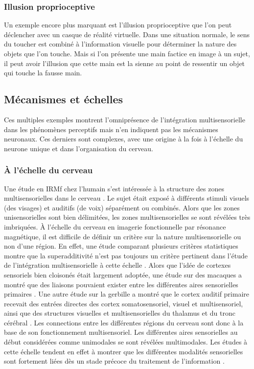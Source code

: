 \subsubsection{Illusion proprioceptive}

Un exemple encore plus marquant est l'illusion proprioceptive que l'on peut déclencher avec un casque de réalité virtuelle. Dans une situation normale, le sens du toucher est combiné à l'information visuelle pour déterminer la nature des objets que l'on touche. Mais si l'on présente une main factice en image à un sujet, il peut avoir l'illusion que cette main est la sienne au point de ressentir un objet qui touche la fausse main.

\subsection{Mécanismes et échelles}

Ces multiples exemples montrent l'omniprésence de l'intégration multisensorielle dans les phénomènes perceptifs mais n'en indiquent pas les mécanismes neuronaux. Ces derniers sont complexes, avec une origine à la fois à l'échelle du neurone unique et dans l'organisation du cerveau.

\subsubsection{À l'échelle du cerveau}

Une étude en IRMf chez l'humain s'est intéressée à la structure des zones multisensorielles dans le cerveau \cite{beauchamp_unraveling_2004}. Le sujet était exposé à différents stimuli visuels (des visages) et auditifs (de voix) séparément ou combinés. Alors que les zones unisensorielles sont bien délimitées, les zones multisensorielles se sont révélées très imbriquées.
À l'échelle du cerveau en imagerie fonctionnelle par résonance magnétique, il est difficile de définir un critère sur la nature multisensorielle ou non d'une région. En effet, une étude comparant plusieurs critères statistiques montre que la superadditivité n'est pas toujours un critère pertinent dans l'étude de l'intégration multisensorielle à cette échelle \cite{beauchamp_statistical_2005}.
Alors que l'idée de cortexes sensoriels bien cloisonés était largement adoptée, une étude sur des macaques a montré que des liaisons pouvaient exister entre les différentes aires sensorielles primaires \cite{brosch_nonauditory_2005}. Une autre étude sur la gerbille a montré que le cortex auditif primaire recevait des entrées directes des cortex somatosensoriel, visuel et multisensoriel, ainsi que des structures visuelles et multisensorielles du thalamus et du tronc cérébral \cite{budinger_multisensory_2006}.
Les connections entre les différentes régions du cerveau sont donc à la base de son fonctionnement multisensoriel. Les différentes aires sensorielles au début considérées comme unimodales se sont révélées multimodales. Les études à cette échelle tendent en effet à montrer que les différentes modalités sensorielles sont fortement liées dès un stade précoce du traitement de l'information \cite{stein_multisensory_2008}.

